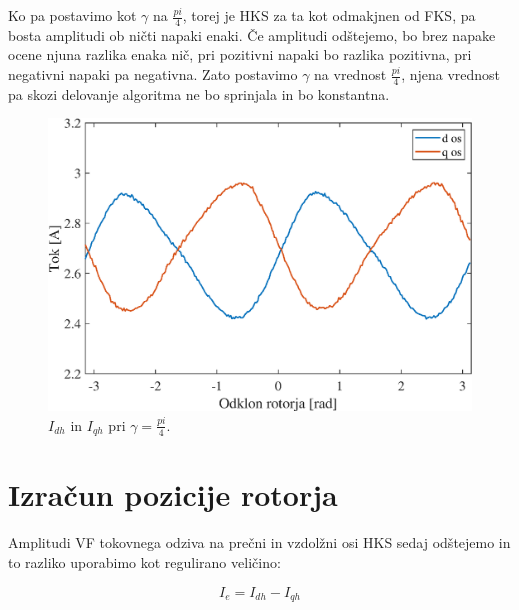 \documentclass[a4paper,twoside,openright,12pt,slovene]{book}
\begin{document}
Ko pa postavimo kot $\gamma$ na $\frac{pi}{4}$, torej je HKS za ta kot odmakjnen od FKS, pa bosta amplitudi ob ničti napaki enaki. Če amplitudi odštejemo, bo brez napake ocene njuna razlika enaka nič,
pri pozitivni napaki bo razlika pozitivna, pri negativni napaki pa negativna. Zato postavimo $\gamma$ na vrednost $\frac{pi}{4}$, njena vrednost pa skozi delovanje algoritma ne bo sprinjala in bo
konstantna.

\begin{figure}[!htbp]
    \centering
    \includegraphics[width=0.95\columnwidth]{Slike/tokovniOdzivKot45.eps}
    \caption{\label{tokovniOdzivKot45} $I_{dh}$ in $I_{qh}$ pri  $\gamma = \frac{pi}{4}$.}
\end{figure}

\section{Izračun pozicije rotorja}

Amplitudi VF tokovnega odziva na prečni in vzdolžni osi HKS sedaj odštejemo in to razliko uporabimo kot regulirano veličino:

\begin{equation}
    I_e = I_{dh} - I_{qh}
\end{equation}
\end{document}
